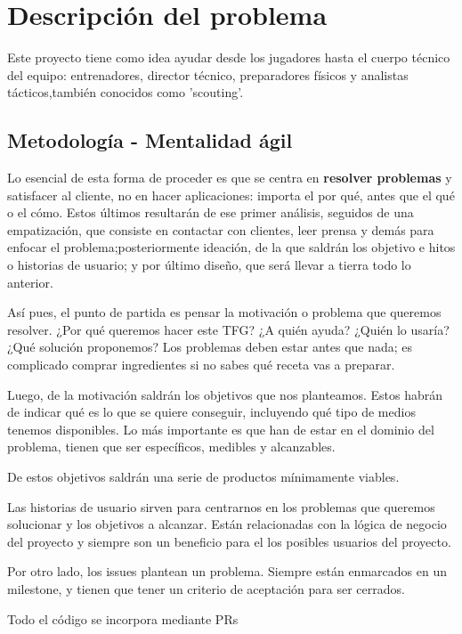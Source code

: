 \chapter{Descripción del problema}

Este proyecto tiene como idea ayudar desde los jugadores hasta 
el cuerpo técnico del equipo: entrenadores, director técnico, preparadores 
físicos y analistas tácticos,también conocidos como 'scouting'.

\section{Metodología - Mentalidad ágil}
Lo esencial de esta forma de proceder es que se centra en \textbf{resolver problemas} y satisfacer 
al cliente, no en hacer aplicaciones: importa el por qué, antes que el qué o el cómo. Estos 
últimos resultarán de ese primer análisis, seguidos de una empatización, que consiste 
en contactar con clientes, leer prensa y demás para enfocar el problema;posteriormente 
ideación, de la que saldrán los objetivo e hitos o historias de usuario; y por último diseño, 
que será llevar a tierra todo lo anterior.

Así pues, el punto de partida es pensar la motivación o problema que queremos resolver. 
¿Por qué queremos hacer este TFG? ¿A quién ayuda? ¿Quién lo usaría? ¿Qué solución proponemos? 
Los problemas deben estar antes que nada; es complicado comprar ingredientes si no sabes qué 
receta vas a preparar. 

Luego, de la motivación saldrán los objetivos que nos planteamos. Estos habrán de indicar 
qué es lo que se quiere conseguir, incluyendo qué tipo de medios tenemos disponibles. Lo 
más importante es que han de estar en el dominio del problema, tienen que ser específicos, 
medibles y alcanzables\cite{objetivos}. 

De estos objetivos saldrán una serie de productos mínimamente viables. 

Las historias de usuario sirven para centrarnos en los problemas que queremos solucionar 
y los objetivos a alcanzar. Están relacionadas con la lógica de 
negocio del proyecto y siempre son un beneficio para el los posibles usuarios del proyecto.

Por otro lado, los issues  plantean un problema. Siempre están enmarcados en un milestone, 
y tienen que tener un criterio de aceptación para ser cerrados. 

Todo el código se incorpora mediante PRs



